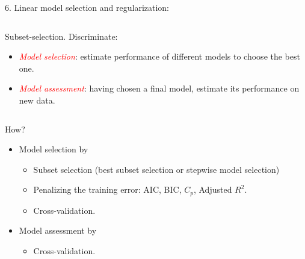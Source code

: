 \documentclass[10pt,ignorenonframetext,]{beamer}
\providecommand{\tightlist}{%
  \setlength{\itemsep}{0pt}\setlength{\parskip}{0pt}}
\begin{document}
\begin{frame}

\begin{block}{6. Linear model selection and regularization:}

\(~\)

Subset-selection. Discriminate: \vspace{2mm}

\begin{itemize}
\tightlist
\item
  \emph{\textcolor{red}{Model selection}}: estimate performance of
  different models to choose the best one.
\item
  \emph{\textcolor{red}{Model assessment}}: having chosen a final model,
  estimate its performance on new data.
\end{itemize}

\(~\)

How?

\vspace{2mm}

\begin{itemize}
\tightlist
\item
  Model selection by

  \begin{itemize}
  \tightlist
  \item
    Subset selection (best subset selection or stepwise model selection)
  \item
    Penalizing the training error: AIC, BIC, \(C_p\), Adjusted \(R^2\).
  \item
    Cross-validation.
  \end{itemize}
\end{itemize}

\vspace{2mm}

\begin{itemize}
\tightlist
\item
  Model assessment by

  \begin{itemize}
  \tightlist
  \item
    Cross-validation.
  \end{itemize}
\end{itemize}

\end{block}

\end{frame}
\end{document}
